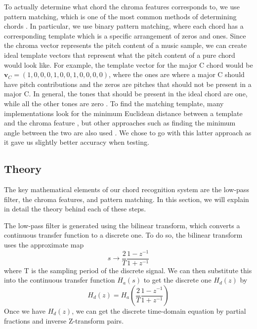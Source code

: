\documentclass[journal]{IEEEtran}
\begin{document}
To actually determine what chord the chroma features corresponds to, we use pattern matching, which is one of the most common methods of determining chords \cite{cho_chroma}.
In particular, we use binary pattern matching, where each chord has a corresponding template which is a specific arrangement of zeros and ones.
Since the chroma vector represents the pitch content of a music sample, we can create ideal template vectors that represent what the pitch content of a pure chord would look like.
For example, the template vector for the major C chord would be $\mathbf{v}_C = (1, 0, 0, 0, 1, 0, 0, 1, 0, 0, 0, 0)$, where the ones are where a major C should have pitch contributions and the zeros are pitches that should not be present in a major C.
In general, the tones that should be present in the ideal chord are one, while all the other tones are zero \cite{cho_chroma}.
To find the matching template, many implementations look for the minimum Euclidean distance between a template and the chroma feature \cite{stark}, but other approaches such as finding the minimum angle between the two are also used \cite{jiang}.
We chose to go with this latter approach as it gave us slightly better accuracy when testing.

\subsection{Theory}
The key mathematical elements of our chord recognition system are the low-pass filter, the chroma features, and pattern matching.
In this section, we will explain in detail the theory behind each of these steps.

The low-pass filter is generated using the bilinear transform, which converts a continuous transfer function to a discrete one.
To do so, the bilinear transform uses the approximate map
\begin{equation}
    s \to \frac{2}{T}\frac{1 - z^{-1}}{1 + z^{-1}}
    \label{eq:s_to_z}
\end{equation}
where T is the sampling period of the discrete signal.
We can then substitute this into the continuous transfer function $H_a(s)$ to get the discrete one $H_d(z)$ by 
\begin{equation}
    H_d(z) = H_a\!\left(\frac{2}{T}\frac{1 - z^{-1}}{1 + z^{-1}}\right)
    \label{eq:bilinear}
\end{equation}
Once we have $H_d(z)$, we can get the discrete time-domain equation by partial fractions and inverse Z-transform pairs.
\end{document}

